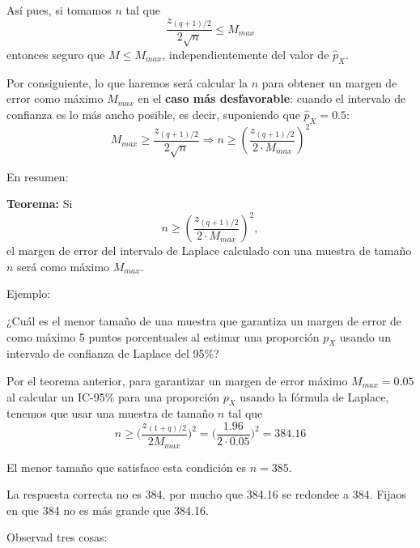 \documentclass[
  spanish,
  letterpaper,
  DIV=11,
  numbers=noendperiod]{scrreprt}
\begin{document}
Así pues, si tomamos \(n\) tal que \[
\frac{z_{(q+1)/2}}{2\sqrt{n}}\leqslant M_{max}
\] entonces seguro que \(M\leqslant M_{max}\), independientemente del
valor de \(\widehat{p}_{X}\).

Por consiguiente, lo que haremos será calcular la \(n\) para obtener un
margen de error como máximo \(M_{max}\) en el \textbf{caso más
desfavorable}: cuando el intervalo de confianza es lo más ancho posible,
es decir, suponiendo que \(\widehat{p}_{X}=0.5\): \[
M_{max}\geqslant \frac{z_{(q+1)/2}}{2\sqrt{n}}
\Longrightarrow
n\geqslant \left(\frac{z_{(q+1)/2}}{2\cdot M_{max}}
\right)^2
\]

En resumen:

\textbf{Teorema:} Si \[
n\geqslant \left(\frac{z_{(q+1)/2}}{2\cdot M_{max}}\right)^2,
\] el margen de error del intervalo de Laplace calculado con una muestra
de tamaño \(n\) será como máximo \(M_{max}\).

Ejemplo:

¿Cuál es el menor tamaño de una muestra que garantiza un margen de error
de como máximo 5 puntos porcentuales al estimar una proporción \(p_X\)
usando un intervalo de confianza de Laplace del 95\%?

Por el teorema anterior, para garantizar un margen de error máximo
\(M_{max}= 0.05\) al calcular un IC-95\% para una proporción \(p_X\)
usando la fórmula de Laplace, tenemos que usar una muestra de tamaño
\(n\) tal que \[
n\geqslant \Bigg(\frac{z_{(1+q)/2}}{2M_{max}}\Bigg)^2=\Bigg(\frac{1.96}{2\cdot 0.05}\Bigg)^2=384.16
\]

El menor tamaño que satisface esta condición es \(n=385\).

\begin{tcolorbox}[enhanced jigsaw, arc=.35mm, bottomrule=.15mm, bottomtitle=1mm, breakable, colback=white, colbacktitle=quarto-callout-warning-color!10!white, colframe=quarto-callout-warning-color-frame, coltitle=black, left=2mm, leftrule=.75mm, opacityback=0, opacitybacktitle=0.6, rightrule=.15mm, title=\textcolor{quarto-callout-warning-color}{\faExclamationTriangle}\hspace{0.5em}{Advertencia}, titlerule=0mm, toprule=.15mm, toptitle=1mm]

La respuesta correcta no es 384, por mucho que 384.16 se redondee a 384.
Fijaos en que 384 no es más grande que 384.16.

\end{tcolorbox}

Observad tres cosas:
\end{document}
